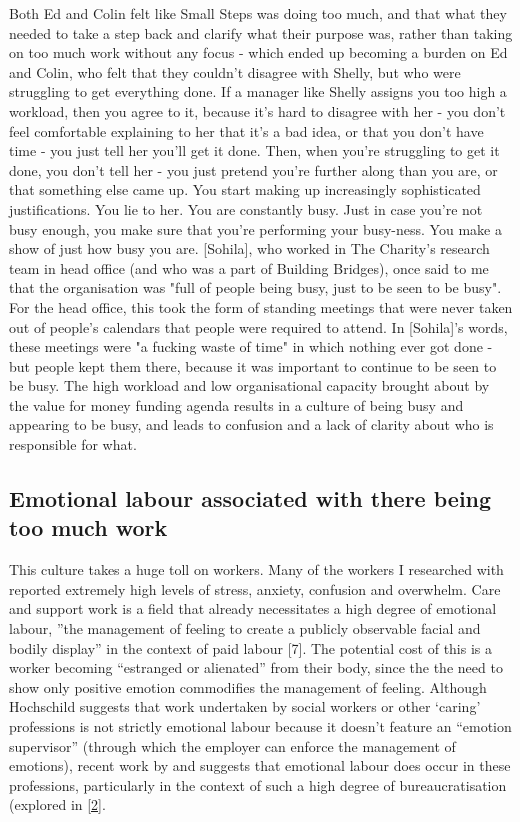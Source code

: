 Both Ed and Colin felt like Small Steps was doing too much, and that what they needed to take a step back and clarify what their purpose was, rather than taking on too much work without any focus - which ended up becoming a burden on Ed and Colin, who felt that they couldn't disagree with Shelly, but who were struggling to get everything done. If a manager like Shelly assigns you too high a workload, then you agree to it, because it's hard to disagree with her - you don't feel comfortable explaining to her that it's a bad idea, or that you don't have time - you just tell her you'll get it done. Then, when you're struggling to get it done, you don't tell her - you just pretend you're further along than you are, or that something else came up. You start making up increasingly sophisticated justifications. You lie to her. You are constantly busy. Just in case you're not busy enough, you make sure that you're performing your busy-ness. You make a show of just how busy you are. [Sohila], who worked in The Charity’s research team in head office (and who was a part of Building Bridges), once said to me that the organisation was "full of people being busy, just to be seen to be busy". For the head office, this took the form of standing meetings that were never taken out of people's calendars that people were required to attend. In [Sohila]'s words, these meetings were "a fucking waste of time" in which nothing ever got done - but people kept them there, because it was important to continue to be seen to be busy. The high workload and low organisational capacity brought about by the value for money funding agenda results in a culture of being busy and appearing to be busy, and leads to confusion and a lack of clarity about who is responsible for what. 

\subsection{Emotional labour associated with there being too much work}
This culture takes a huge toll on workers. Many of the workers I researched with reported extremely high levels of stress, anxiety, confusion and overwhelm. Care and support work is a field that already necessitates a high degree of emotional labour, ”the management of feeling to create a publicly observable facial and bodily display” in the context of paid labour \citep{hochschild_managed_2012}[7]. The potential cost of this is a worker becoming “estranged or alienated” from their body, since the the need to show only positive emotion commodifies the management of feeling. Although Hochschild suggests that work undertaken by social workers or other ‘caring’ professions is not strictly emotional labour because it doesn’t feature an “emotion supervisor” (through which the employer can enforce the management of emotions), recent work by \citep{leeson_emotional_2010} and \citep{winter_emotional_2018} suggests that emotional labour does occur in these professions, particularly in the context of such a high degree of bureaucratisation (explored in \ref{2}. 

